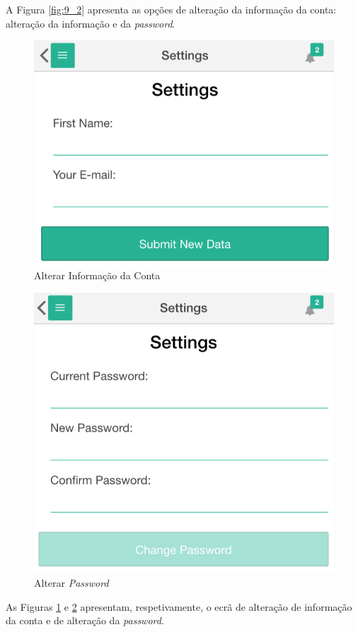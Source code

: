 A Figura \ref{fig:9_2} apresenta as opções de alteração da informação da conta: alteração da informação e da \textit{password}. 

\begin{figure}[H]
	\begin{center}
		\includegraphics[width=0.5
		\textwidth]{settings/change_account.png}
	\end{center}
	\caption{Alterar Informação da Conta}
	\label{fig:9_3}
\end{figure}

\begin{figure}[H]
	\begin{center}
		\includegraphics[width=0.5
		\textwidth]{settings/change_password.png}
	\end{center}
	\caption{Alterar \textit{Password}}
	\label{fig:9_4}
\end{figure}

As Figuras \ref{fig:9_3} e \ref{fig:9_4} apresentam, respetivamente, o ecrã de alteração de informação da conta e de alteração da \textit{password}.